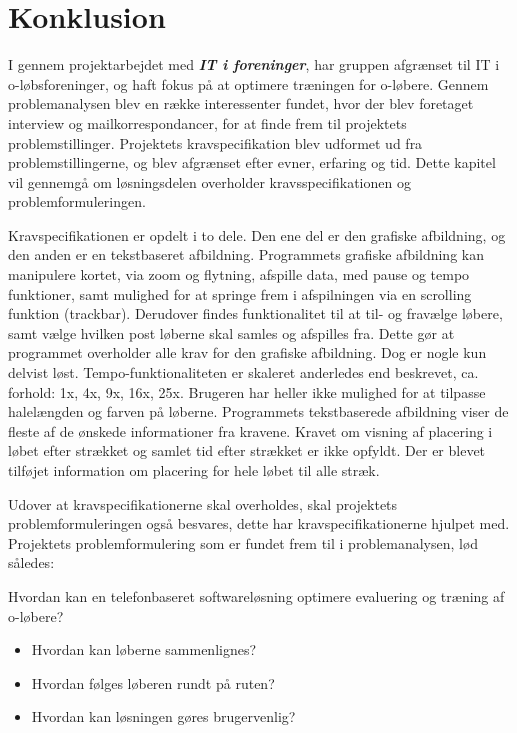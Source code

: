 \chapter{Konklusion}
I gennem projektarbejdet med \textbf{\textit{IT i foreninger}}, har gruppen afgrænset til IT i o-løbsforeninger, og haft fokus på at optimere træningen for o-løbere. Gennem problemanalysen blev en række interessenter fundet, hvor der blev foretaget interview og mailkorrespondancer, for at finde frem til projektets problemstillinger. Projektets kravspecifikation blev udformet ud fra problemstillingerne, og blev afgrænset efter evner, erfaring og tid. Dette kapitel vil gennemgå om løsningsdelen overholder kravsspecifikationen og problemformuleringen.

Kravspecifikationen er opdelt i to dele. Den ene del er den grafiske afbildning, og den anden er en tekstbaseret afbildning.\newline
Programmets grafiske afbildning kan manipulere kortet, via zoom og flytning, afspille data, med pause og tempo funktioner, samt mulighed for at springe frem i afspilningen via en scrolling funktion (trackbar). Derudover findes funktionalitet til at til- og fravælge løbere, samt vælge hvilken post løberne skal samles og afspilles fra. Dette gør at programmet overholder alle krav for den grafiske afbildning. Dog er nogle kun delvist løst. Tempo-funktionaliteten er skaleret anderledes end beskrevet, ca. forhold: 1x, 4x, 9x, 16x, 25x. Brugeren har heller ikke mulighed for at tilpasse halelængden og farven på løberne. \newline
Programmets tekstbaserede afbildning viser de fleste af de ønskede informationer fra kravene. Kravet om visning af placering i løbet efter strækket og samlet tid efter strækket er ikke opfyldt. Der er blevet tilføjet information om placering for hele løbet til alle stræk.

Udover at kravspecifikationerne skal overholdes, skal projektets problemformuleringen også besvares, dette har kravspecifikationerne hjulpet med. Projektets problemformulering som er fundet frem til i problemanalysen, lød således:

Hvordan kan en telefonbaseret softwareløsning optimere evaluering og træning af o-løbere?
\begin{itemize}
	\item Hvordan kan løberne sammenlignes?
	\item Hvordan følges løberen rundt på ruten?
	\item Hvordan kan løsningen gøres brugervenlig?
\end{itemize}

